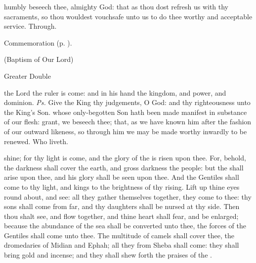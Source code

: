 \postcommunion
{} humbly beseech thee, almighty God: that as thou dost refresh us with thy sacraments, so thou wouldest vouchsafe unto us to do thee worthy and acceptable service. Through.
\begin{rubric}
    Commemoration  (p. \pageref{EpiphanyMassPostcommunion}).
\end{rubric}



\centerline{\small{(Baptism of Our Lord)}}

\begin{inhead}
{Greater Double}
\end{inhead}


\introit
{} the Lord the ruler is come: and in his hand the kingdom, and power, and dominion. \textit{Ps.} Give the King thy judgements, O God: and thy righteousness unto the King's Son.
\collect
{} whose only-begotten Son hath been made manifest in substance of our flesh: grant, we beseech thee; that, as we have known him after the fashion of our outward likeness, so through him we may be made worthy inwardly to be renewed. Who liveth.

 shine; for thy light is come, and the glory of the  is risen upon thee. For, behold, the darkness shall cover the earth, and gross darkness the people: but the  shall arise upon thee, and his glory shall be seen upon thee. And the Gentiles shall come to thy light, and kings to the brightness of thy rising. Lift up thine eyes round about, and see: all they gather themselves together, they come to thee: thy sons shall come from far, and thy daughters shall be nursed at thy side. Then thou shalt see, and flow together, and thine heart shall fear, and be enlarged; because the abundance of the sea shall be converted unto thee, the forces of the Gentiles shall come unto thee. The multitude of camels shall cover thee, the dromedaries of Midian and Ephah; all they from Sheba shall come: they shall bring gold and incense; and they shall shew forth the praises of the .


